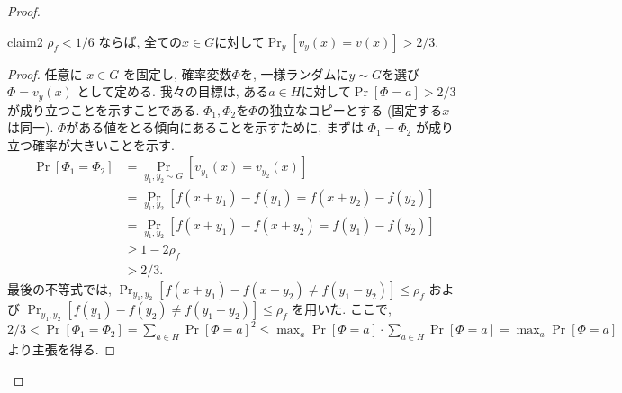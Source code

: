 \begin{proof}
    \begin{claim}{}{claim2}
      $\rho_f<1/6$ ならば, 全ての$x\in G$に対して$\Pr_y[v_y(x)= v(x)] > 2/3$.
    \end{claim}
    \begin{proof}
      任意に $x\in G$ を固定し, 確率変数$\Phi$を, 一様ランダムに$y\sim G$を選び $\Phi=v_y(x)$ として定める. 我々の目標は, ある$a\in H$に対して$\Pr[\Phi=a]>2/3$ が成り立つことを示すことである.
      $\Phi_1,\Phi_2$を$\Phi$の独立なコピーとする (固定する$x$は同一). $\Phi$がある値をとる傾向にあることを示すために, まずは $\Phi_1=\Phi_2$ が成り立つ確率が大きいことを示す.
      \begin{align*}
      \Pr[\Phi_1 = \Phi_2] &= \Pr_{y_1,y_2\sim G}[ v_{y_1}(x) = v_{y_2}(x) ] \\
      &= \Pr_{y_1,y_2}[ f(x+y_1) - f(y_1) = f(x+y_2) - f(y_2) ] \\
      &= \Pr_{y_1,y_2}[ f(x+y_1)-f(x+y_2) = f(y_1)-f(y_2) ] \\
      &\ge 1-2\rho_f \\
      &> 2/3.
      \end{align*}    
      最後の不等式では, $\Pr_{y_1,y_2}[f(x+y_1)-f(x+y_2) \ne f(y_1-y_2)]\le \rho_f$ および $\Pr_{y_1,y_2}[f(y_1)-f(y_2)\ne f(y_1-y_2)]\le \rho_f$ を用いた.    
      ここで, $2/3<\Pr[\Phi_1=\Phi_2]=\sum_{a\in H}\Pr[\Phi=a]^2 \le \max_a\Pr[\Phi=a]\cdot \sum_{a\in H}\Pr[\Phi=a] = \max_a\Pr[\Phi=a]$ より主張を得る.
    \end{proof}


\end{proof}
